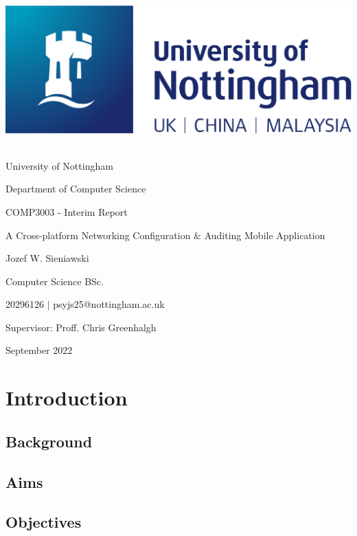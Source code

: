 \documentclass [12pt,letterpaper]{article}
\begin{document}
 
\thispagestyle{empty}
\begin{center}
    \centering
    \includegraphics[width=0.3\linewidth]{images/nottingham-logo.png}
    \vspace{0.1cm}
    {\Large \\University of Nottingham\par}
    {\Large Department of Computer Science\par}
    \vspace{3cm}
    {\Large COMP3003 - Interim Report\par}
    \vspace{0.5cm}
    {\Large A Cross-platform Networking Configuration \& Auditing Mobile Application\par}
    \vspace{2.5cm}
    {\Large Jozef W. Sieniawski\par}
    {\small Computer Science BSc. \par}
    {\small 20296126 $|$ psyjs25@nottingham.ac.uk\par}
    \vspace{1cm}
    {\normalsize Supervisor: Proff. Chris Greenhalgh\par}
    \vspace{3cm}
    {\Large September 2022}
\end{center}

\pagebreak
\tableofcontents
\pagebreak

\setlength{\parskip}{2ex}

\section{Introduction}
\label{sec:introduction}
\subsection{Background}
\label{sec:background}
\subsection{Aims}
\label{sec:aims}
\subsection{Objectives}
\label{sec:objectives}
\end{document}
